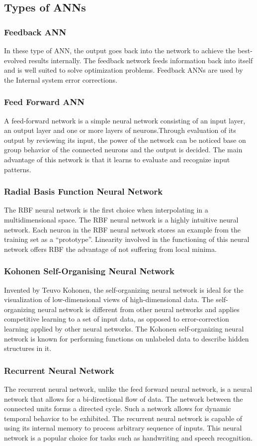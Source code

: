 \subsection{Types of ANNs}
\subsubsection{Feedback ANN}
In these type of ANN, the output goes back into the network to achieve the best-evolved results internally. The feedback network feeds information back into itself and is well suited to solve optimization problems. Feedback ANNs are used by the Internal system error corrections. 
\subsubsection{Feed Forward ANN}
A feed-forward network is a simple neural network consisting of an input layer, an output layer and one or more layers of neurons.Through evaluation of its output by reviewing its input, the power of the network can be noticed base on group behavior of the connected neurons and the output is decided. The main advantage of this network is that it learns to evaluate and recognize input patterns.
\subsubsection{Radial Basis Function Neural Network}
The RBF neural network is the first choice when interpolating in a multidimensional space. The RBF neural network is a highly intuitive neural network. Each neuron in the RBF neural network stores an example from the training set as a “prototype”. Linearity involved in the functioning of this neural network offers RBF the advantage of not suffering from local minima.
\subsubsection{Kohonen Self-Organising Neural Network}
Invented by Teuvo Kohonen, the self-organizing neural network is ideal for the visualization of low-dimensional views of high-dimensional data. The self-organizing neural network is different from other neural networks and applies competitive learning to a set of input data, as opposed to error-correction learning applied by other neural networks. The Kohonen self-organizing neural network is known for performing functions on unlabeled data to describe hidden structures in it.
\subsubsection{Recurrent Neural Network}
The recurrent neural network, unlike the feed forward neural network, is a neural network that allows for a bi-directional flow of data. The network between the connected units forms a directed cycle. Such a network allows for dynamic temporal behavior to be exhibited. The recurrent neural network is capable of using its internal memory to process arbitrary sequence of inputs. This neural network is a popular choice for tasks such as handwriting and speech recognition.
